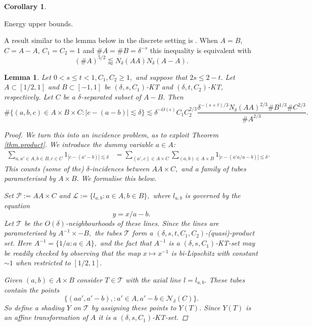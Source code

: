 \documentclass[12pt]{amsart}
\newtheorem{lemma}[theorem]{Lemma}
\newtheorem{corollary}[theorem]{Corollary}
\newcounter{stepctr}
\newif\ifinsteppage
\newenvironment{steps}{%
	\setcounter{stepctr}{0}%
	\insteppagefalse
}{%
	\par\bigskip
}
\newcommand{\step}[1]{%
	\ifinsteppage
	\par\bigskip
	\fi
	\insteppagetrue
	\refstepcounter{stepctr}%
	\noindent\text{Step \thestepctr:} #1.\par
}
\newcommand{\dem}{\de^{-O(\e)}}
\newcommand{\les}{\lessapprox}
\newcommand{\cP}{\mathcal{P}}
\newcommand{\cT}{\mathcal{T}}
\newcommand{\cL}{\mathcal{L}}
\newcommand{\cN}{\mathcal{N}}
\newcommand{\1}{\mathbf{1}}
\newcommand{\de}{\delta}
\newcommand{\e}{\epsilon}
\newcommand{\cn}[1]{N_\de({#1})}
\begin{document}
\begin{steps}
\begin{corollary}
	\end{corollary}
\step{Energy upper bounds}
A  result similar to the lemma below in the discrete setting is \cite[Lemma 2]{rud}. When $A=B$, $C=A-A$, $C_1=C_2=1$ and $\#A=\#B=\delta^{-s}$ this inequality is equivalent with 
$$(\#A)^{5/2}\les \cn{AA}\cn{A-A}.$$
\begin{lemma}\label{lem.representations}
		Let $0 < s \leq t < 1, C_1,C_2 \geq 1,$ and suppose that $2s \leq 2- t.$  Let $A \subset [1/2,1]$ and $B \subset [-1,1]$ be $(\delta,s,C_1)$-KT and $(\delta,t,C_2)$-KT, respectively. Let $C$ be a $\de$-separated subset of $A-B.$ Then
        \begin{equation}
            \# \{(a,b,c) \in A\times B \times C: |c- (a-b)| \lesssim \de \} \lesssim \dem  C_1C_2^{2/3}\frac{\delta^{-(s+t)/3}\cn{AA}^{2/3}\#B^{1/3}\#C^{2/3}}{\# A^{2/3}}.
        \end{equation}
		\begin{proof}
			We turn this into an incidence problem, as to exploit Theorem \ref{thm.product}. We introduce the dummy variable $a \in A$:
			\begin{align}\label{eq.step1}
				\sum_{a,a' \in A, b \in B, c \in C} 1_{|c - (a'-b)| \lesssim \delta} &= \sum_{(a',c) \in A \times C}\sum_{(a,b) \in A \times B} 1_{|c - (a'a/a-b)| \lesssim \delta}.
			\end{align}
		This counts (some of the) $\de$-incidences between $AA \times C,$ and a family of tubes parameterised by $A \times B.$ We formalise this below.
		
		 Set $\cP:= AA \times C$ and  $\cL := \{l_{a,b}: a \in A, b \in B\},$ where $l_{a,b}$ is governed by the equation
			\begin{equation}
				y = x/a - b.
			\end{equation}
			Let $\cT$ be the $O(\de)$-neighbourhoods of these lines. Since the lines are parameterised by $A^{-1} \times -B,$ the tubes $\cT$ form a $(\de,s,t,C_1,C_2)$-(quasi)-product set. Here $A^{-1} = \{1/a : a \in A\},$ and the fact that $A^{-1}$ is a $(\de,s,C_1)$-KT-set may be readily checked by observing that the map $x \mapsto x^{-1}$ is bi-Lipschitz with constant $\sim 1$ when restricted to $[1/2,1].$
			
			
		Given $(a,b) \in A \times B$ consider $T \in \cT$ with the axial line $l = l_{a,b}.$ These tubes contain the points 
		$$\{(aa',a'-b), : a' \in A, a'-b \in \cN_\de(C)\}.$$
		So define a shading $Y$ on $\cT$ by assigning these points to $Y(T).$ 
			Since $Y(T)$ is an affine transformation of $A$ it is a $(\delta,s,C_1)$-KT-set. 
			

\end{proof}
\end{lemma}
\end{steps}
\end{document}
